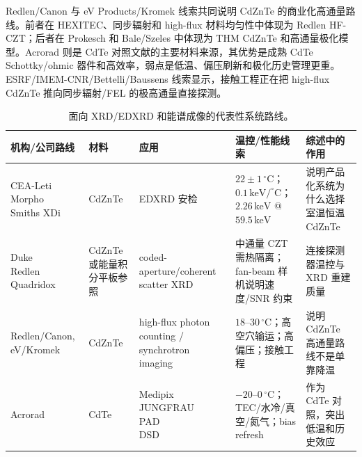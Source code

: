 \documentclass[
  aps,
  prd,
  reprint,
  superscriptaddress,
  floatfix,
  amsmath,
  amssymb
]{revtex4-2}
\newcommand{\degc}{^\circ\mathrm{C}}
\newcommand{\tcell}[2][0.18\textwidth]{\begin{minipage}[t]{#1}\raggedright #2\end{minipage}}
\begin{document}
Redlen/Canon 与 eV Products/Kromek 线索共同说明 CdZnTe 的商业化高通量路线。前者在 HEXITEC、同步辐射和 high-flux 材料均匀性中体现为 Redlen HF-CZT；后者在 Prokesch 和 Bale/Szeles 中体现为 THM CdZnTe 和高通量极化模型\cite{veale2020,thomas2017,prokesch2016,bale2008}。Acrorad 则是 CdTe 对照文献的主要材料来源，其优势是成熟 CdTe Schottky/ohmic 器件和高效率，弱点是低温、偏压刷新和极化历史管理更重\cite{astromskas2016,meyer2022,franklin2024}。ESRF/IMEM-CNR/Bettelli/Baussens 线索显示，接触工程正在把 high-flux CdZnTe 推向同步辐射/FEL 的极高通量直接探测\cite{baussens2022,bettelli2023,greiffenberg2025}。

\begin{table}[t]
\caption{面向 XRD/EDXRD 和能谱成像的代表性系统路线。}
\label{tab:routes}
\centering
\small
\renewcommand{\arraystretch}{1.18}
\begin{tabular}{@{}lllll@{}}
\toprule
\tcell[0.16\textwidth]{机构/公司路线} & \tcell[0.11\textwidth]{材料} & \tcell[0.17\textwidth]{应用} & \tcell[0.24\textwidth]{温控/性能线索} & \tcell[0.21\textwidth]{综述中的作用} \\
\midrule
\tcell[0.16\textwidth]{CEA-Leti\\Morpho\\Smiths XDi} & \tcell[0.11\textwidth]{CdZnTe} & \tcell[0.17\textwidth]{EDXRD 安检} & \tcell[0.24\textwidth]{$22\pm1\,\degc$；$0.1\,\mathrm{keV}/\degc$；$2.26\,\mathrm{keV}$ @ $59.5\,\mathrm{keV}$} & \tcell[0.21\textwidth]{说明产品化系统为什么选择室温恒温 CdZnTe} \\
\tcell[0.16\textwidth]{Duke\\Redlen\\Quadridox} & \tcell[0.11\textwidth]{CdZnTe 或能量积分平板参照} & \tcell[0.17\textwidth]{coded-aperture/coherent scatter XRD} & \tcell[0.24\textwidth]{中通量 CZT 需热隔离；fan-beam 样机说明速度/SNR 约束} & \tcell[0.21\textwidth]{连接探测器温控与 XRD 重建质量} \\
\tcell[0.16\textwidth]{Redlen/Canon, eV/Kromek} & \tcell[0.11\textwidth]{CdZnTe} & \tcell[0.17\textwidth]{high-flux photon counting / synchrotron imaging} & \tcell[0.24\textwidth]{$18$--$30\,\degc$；高空穴输运；高偏压；接触工程} & \tcell[0.21\textwidth]{说明 CdZnTe 高通量路线不是单靠降温} \\
\tcell[0.16\textwidth]{Acrorad} & \tcell[0.11\textwidth]{CdTe} & \tcell[0.17\textwidth]{Medipix\\JUNGFRAU\\PAD\\DSD} & \tcell[0.24\textwidth]{$-20$--$0\,\degc$；TEC/水冷/真空/氮气；bias refresh} & \tcell[0.21\textwidth]{作为 CdTe 对照，突出低温和历史效应} \\
\bottomrule
\end{tabular}
\end{table}
\end{document}
